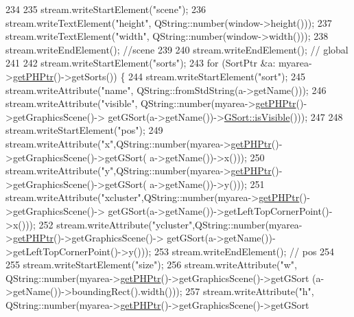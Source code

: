 \begin{DoxyCode}
234 
235     stream.writeStartElement(\textcolor{stringliteral}{"scene"});
236     stream.writeTextElement(\textcolor{stringliteral}{"height"}, QString::number(window->height()));
237     stream.writeTextElement(\textcolor{stringliteral}{"width"}, QString::number(window->width()));
238     stream.writeEndElement(); \textcolor{comment}{//scene}
239 
240     stream.writeEndElement(); \textcolor{comment}{// global}
241 
242     stream.writeStartElement(\textcolor{stringliteral}{"sorts"});
243     \textcolor{keywordflow}{for} (SortPtr &a: myarea->\hyperlink{classMyArea_a7b94b516e730ddcee16d946c76bbc2b3}{getPHPtr}()->getSorts()) \{
244         stream.writeStartElement(\textcolor{stringliteral}{"sort"});
245         stream.writeAttribute(\textcolor{stringliteral}{"name"}, QString::fromStdString(a->getName()));
246         stream.writeAttribute(\textcolor{stringliteral}{"visible"}, QString::number(myarea->\hyperlink{classMyArea_a7b94b516e730ddcee16d946c76bbc2b3}{getPHPtr}()->getGraphicsScene()->
      getGSort(a->getName())->\hyperlink{classGSort_a58e2a6099a59b26ffe7dafd90590bd3d}{GSort::isVisible}()));
247 
248         stream.writeStartElement(\textcolor{stringliteral}{"pos"});
249         stream.writeAttribute(\textcolor{stringliteral}{"x"},QString::number(myarea->\hyperlink{classMyArea_a7b94b516e730ddcee16d946c76bbc2b3}{getPHPtr}()->getGraphicsScene()->getGSort(
      a->getName())->x()));
250         stream.writeAttribute(\textcolor{stringliteral}{"y"},QString::number(myarea->\hyperlink{classMyArea_a7b94b516e730ddcee16d946c76bbc2b3}{getPHPtr}()->getGraphicsScene()->getGSort(
      a->getName())->y()));
251         stream.writeAttribute(\textcolor{stringliteral}{"xcluster"},QString::number(myarea->\hyperlink{classMyArea_a7b94b516e730ddcee16d946c76bbc2b3}{getPHPtr}()->getGraphicsScene()->
      getGSort(a->getName())->getLeftTopCornerPoint()->x()));
252         stream.writeAttribute(\textcolor{stringliteral}{"ycluster"},QString::number(myarea->\hyperlink{classMyArea_a7b94b516e730ddcee16d946c76bbc2b3}{getPHPtr}()->getGraphicsScene()->
      getGSort(a->getName())->getLeftTopCornerPoint()->y()));
253         stream.writeEndElement(); \textcolor{comment}{// pos}
254 
255         stream.writeStartElement(\textcolor{stringliteral}{"size"});
256         stream.writeAttribute(\textcolor{stringliteral}{"w"}, QString::number(myarea->\hyperlink{classMyArea_a7b94b516e730ddcee16d946c76bbc2b3}{getPHPtr}()->getGraphicsScene()->getGSort
      (a->getName())->boundingRect().width()));
257         stream.writeAttribute(\textcolor{stringliteral}{"h"}, QString::number(myarea->\hyperlink{classMyArea_a7b94b516e730ddcee16d946c76bbc2b3}{getPHPtr}()->getGraphicsScene()->getGSort

\end{DoxyCode}
